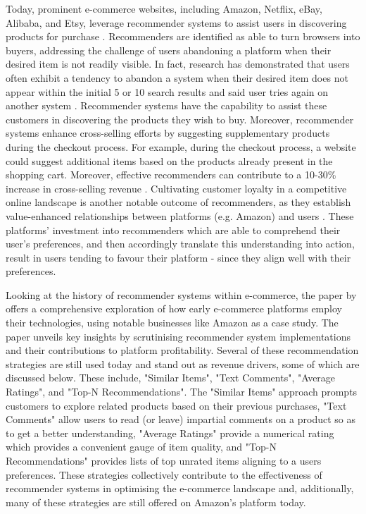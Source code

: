 Today, prominent e-commerce websites, including Amazon, Netflix, eBay, Alibaba, and Etsy, leverage recommender systems to assist users in discovering products for purchase \cite{aivazoglou2020fine}. Recommenders are identified as able to turn browsers into buyers, addressing the challenge of users abandoning a platform when their desired item is not readily visible. In fact, research has demonstrated that users often exhibit a tendency to abandon a system when their desired item does not appear within the initial 5 or 10 search results and said user tries again on another system \cite{linden2003amazon}. Recommender systems have the capability to assist these customers in discovering the products they wish to buy. Moreover, recommender systems enhance cross-selling efforts by suggesting supplementary products during the checkout process. For example, during the checkout process, a website could suggest additional items based on the products already present in the shopping cart. Moreover, effective recommenders can contribute  to a 10-30\% increase in cross-selling revenue \cite{mckinsey_personalization_2021}. Cultivating customer loyalty in a competitive online landscape is another notable outcome of recommenders, as they establish value-enhanced relationships between platforms (e.g. Amazon) and users \cite{linden2003amazon}. These platforms' investment into recommenders which are able to comprehend their user’s preferences, and then accordingly translate this understanding into action, result in users tending to favour their platform - since they align well with their preferences.

Looking at the history of recommender systems within e-commerce, the paper by \cite{schafer1999recommender} offers a comprehensive exploration of how early e-commerce platforms employ their technologies, using notable businesses like Amazon as a case study. The paper unveils key insights by scrutinising recommender system implementations and their contributions to platform profitability. Several of these recommendation strategies are still used today and stand out as revenue drivers, some of which are discussed below. These include, "Similar Items", "Text Comments", "Average Ratings", and "Top-N Recommendations". The "Similar Items" approach prompts customers to explore related products based on their previous purchases, "Text Comments" allow users to read (or leave) impartial comments on a product so as to get a better understanding, "Average Ratings" provide a numerical rating which provides a convenient gauge of item quality, and "Top-N Recommendations" provides lists of top unrated items aligning to a users preferences. These strategies collectively contribute to the effectiveness of recommender systems in optimising the e-commerce landscape and, additionally, many of these strategies are still offered on Amazon’s platform today. 



